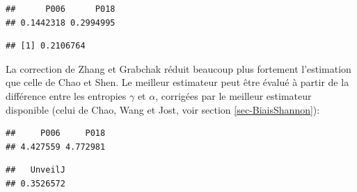 \documentclass[
  11pt,
  french,
  a4paper,
  extrafontsizes,onecolumn,openright
  ]{memoir}
\newenvironment{Shaded}{\begin{snugshade}}{\end{snugshade}}
\newcommand{\CommentTok}[1]{\textcolor[rgb]{0.56,0.35,0.01}{\textit{#1}}}
\newcommand{\DataTypeTok}[1]{\textcolor[rgb]{0.13,0.29,0.53}{#1}}
\newcommand{\DecValTok}[1]{\textcolor[rgb]{0.00,0.00,0.81}{#1}}
\newcommand{\KeywordTok}[1]{\textcolor[rgb]{0.13,0.29,0.53}{\textbf{#1}}}
\newcommand{\NormalTok}[1]{#1}
\newcommand{\OperatorTok}[1]{\textcolor[rgb]{0.81,0.36,0.00}{\textbf{#1}}}
\newcommand{\OtherTok}[1]{\textcolor[rgb]{0.56,0.35,0.01}{#1}}
\newcommand{\StringTok}[1]{\textcolor[rgb]{0.31,0.60,0.02}{#1}}
\begin{document}
\begin{verbatim}
##      P006      P018 
## 0.1442318 0.2994995
\end{verbatim}

\begin{Shaded}
\end{Shaded}

\begin{verbatim}
## [1] 0.2106764
\end{verbatim}

\normalsize

La correction de Zhang et Grabchak réduit beaucoup plus fortement l'estimation que celle de Chao et Shen.
Le meilleur estimateur peut être évalué à partir de la différence entre les entropies \(\gamma\) et \(\alpha\), corrigées par le meilleur estimateur disponible (celui de Chao, Wang et Jost, voir section \ref{sec-BiaisShannon}):

\scriptsize

\begin{Shaded}
\end{Shaded}

\begin{verbatim}
##     P006     P018 
## 4.427559 4.772981
\end{verbatim}

\begin{Shaded}
\end{Shaded}

\begin{verbatim}
##   UnveilJ 
## 0.3526572
\end{verbatim}
\end{document}
